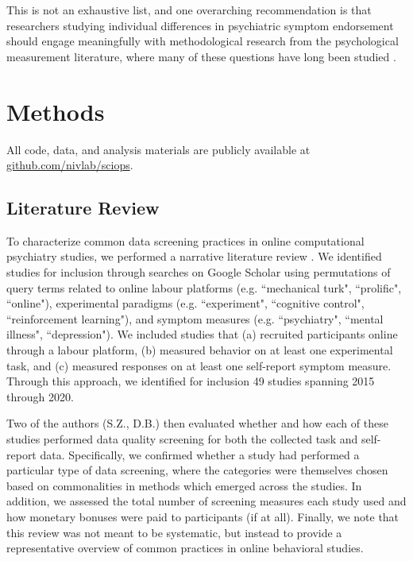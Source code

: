 \documentclass[a4paper,notitlepage,12pt]{article}
\begin{document}
This is not an exhaustive list, and one overarching recommendation is that researchers studying individual differences in psychiatric symptom endorsement should engage meaningfully with methodological research from the psychological measurement literature, where many of these questions have long been studied \cite{huang2015insufficient, curran2016methods, thomas2017validity, desimone2018dirty, ophir2020turker}.

\newpage

\section{Methods}

All code, data, and analysis materials are publicly available at \url{github.com/nivlab/sciops}. 

\subsection{Literature Review}

To characterize common data screening practices in online computational psychiatry studies, we performed a narrative literature review \cite{grant2009typology}. We identified studies for inclusion through searches on Google Scholar using permutations of query terms related to online labour platforms (e.g. ``mechanical turk", ``prolific", ``online"), experimental paradigms (e.g. ``experiment", ``cognitive control", ``reinforcement learning"), and symptom measures (e.g. ``psychiatry", ``mental illness", ``depression"). We included studies that (a) recruited participants online through a labour platform, (b) measured behavior on at least one experimental task, and (c) measured responses on at least one self-report symptom measure. Through this approach, we identified for inclusion 49 studies spanning 2015 through 2020.

Two of the authors (S.Z., D.B.) then evaluated whether and how each of these studies performed data quality screening for both the collected task and self-report data. Specifically, we confirmed whether a study had performed a particular type of data screening, where the categories were themselves chosen based on commonalities in methods which emerged across the studies. In addition, we assessed the total number of screening measures each study used and how monetary bonuses were paid to participants (if at all). Finally, we note that this review was not meant to be systematic, but instead to provide a representative overview of common practices in online behavioral studies.
\end{document}
